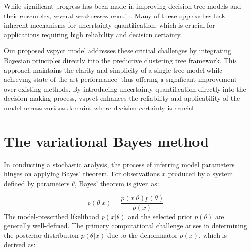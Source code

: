 \documentclass[3p,review,authoryear]{elsarticle}
\begin{document}
While significant progress has been made in improving decision tree models and their ensembles, several weaknesses remain.
Many of these approaches lack inherent mechanisms for uncertainty quantification, which is crucial for applications requiring high reliability and decision certainty.

Our proposed \gls{vspyct} model addresses these critical challenges by integrating Bayesian principles directly into the predictive clustering tree framework.
This approach maintains the clarity and simplicity of a single tree model while achieving state-of-the-art performance, thus offering a significant improvement over existing methods.
By introducing uncertainty quantification directly into the decision-making process, \gls{vspyct} enhances the reliability and applicability of the model across various domains where decision certainty is crucial.


\section{The variational Bayes method}


In conducting a stochastic analysis, the process of inferring model parameters hinges on applying Bayes' theorem.
For observations $x$ produced by a system defined by parameters $\theta$, Bayes' theorem is given as:

\begin{equation}
p(\theta|x)=\frac{p(x|\theta)p(\theta)}{p(x)}
\label{eq:bayes_rule}
\end{equation}
The model-prescribed likelihood $p(x|\theta)$ and the selected prior $p(\theta)$ are generally well-defined.
The primary computational challenge arises in determining the posterior distribution $p(\theta|x)$ due to the denominator $p(x)$, which is derived as:
\end{document}
